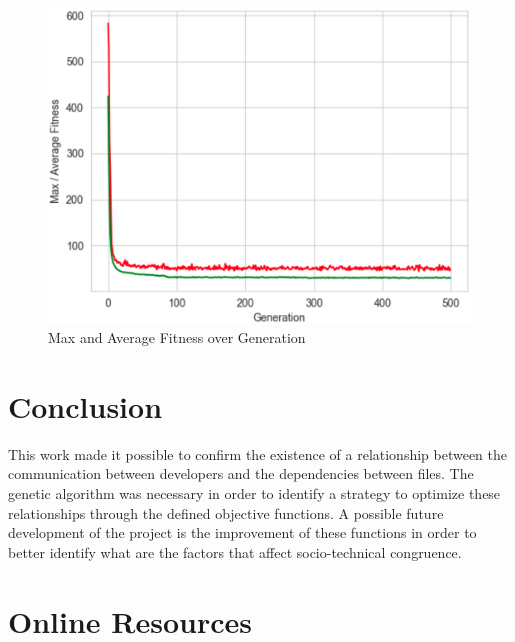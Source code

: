 \documentclass[sigconf]{acmart}
\begin{document}
\begin{figure}[h]
  \centering
  \includegraphics[width=\linewidth]{img_7}
  \caption{Max and Average Fitness over Generation}
  \Description{}
\end{figure}

\section{Conclusion}
This work made it possible to confirm the existence of a relationship between the communication between developers and the dependencies between files. The genetic algorithm was necessary in order to identify a strategy to optimize these relationships through the defined objective functions.
A possible future development of the project is the improvement of these functions in order to better identify what are the factors that affect socio-technical congruence.





\appendix
\section{Online Resources}
\end{document}
